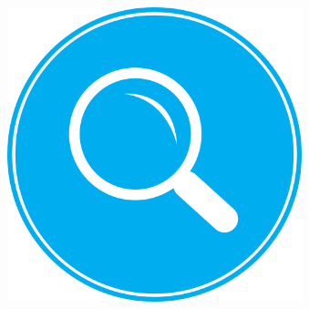 \documentclass{beamer}
\begin{document}
\begin{frame}
\begin{columns}[c]
\begin{figure}
\begin{center}
	    		\end{center}
	    	\end{figure}
	    	\begin{figure}
	    		\begin{center}
	    			\includegraphics[scale=0.1]{images/2icons/rq.png}
	    		\end{center}
	    	\end{figure}
	    \end{columns}
\end{frame}
\end{document}
